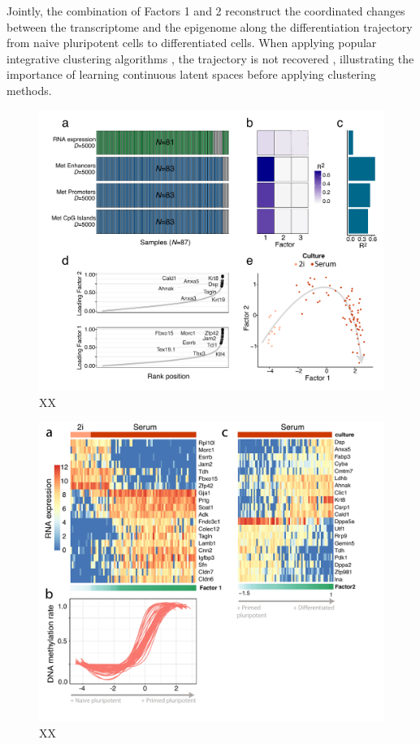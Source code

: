 Jointly, the combination of Factors 1 and 2 reconstruct the coordinated changes between the transcriptome and the epigenome along the differentiation trajectory from naive pluripotent cells to differentiated cells. When applying popular integrative clustering algorithms \cite{Wang2014,Shen2009,Mo2013}, the trajectory is not recovered , illustrating the importance of learning continuous latent spaces before applying clustering methods.

\begin{figure}[H]
	\centering 	
	\includegraphics[width=1.0\textwidth]{MOFA_scMT}
	\caption{XX}
	\label{fig:MOFA_scMT}
\end{figure}

\begin{figure}[H]
	\centering 	
	\includegraphics[width=1.0\textwidth]{MOFA_scMT2}
	\caption{XX}
	\label{fig:MOFA_scMT2}
\end{figure}

